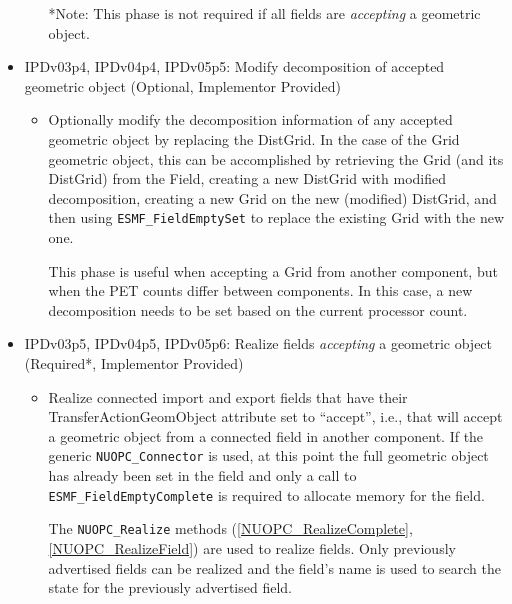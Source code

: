 \begin{itemize}
\begin{itemize}
*Note: This phase is not required if all fields are {\em accepting} a geometric object.
  \end{itemize}
\item IPDv03p4, IPDv04p4, IPDv05p5: Modify decomposition of accepted geometric object ({\sc Optional, Implementor Provided})
  \begin{itemize}
  \item Optionally modify the decomposition information of any accepted geometric object by replacing the DistGrid. In the case of the Grid geometric object, this can be accomplished by retrieving the Grid (and its DistGrid) from the Field, creating a new DistGrid with modified decomposition, creating a new Grid on the new (modified) DistGrid, and then using {\tt ESMF\_FieldEmptySet} to replace the existing Grid with the new one.

This phase is useful when accepting a Grid from another component, but when the PET counts differ between components. In this case, a new decomposition needs to be set based on the current processor count.
  \end{itemize}
\item IPDv03p5, IPDv04p5, IPDv05p6: Realize fields {\em accepting} a geometric object ({\sc Required*, Implementor Provided})
  \begin{itemize}
  \item Realize connected import and export fields that have their TransferActionGeomObject attribute set to ``accept'', i.e., that will accept a geometric object from a connected field in another component.  If the generic {\tt NUOPC\_Connector} is used, at this point the full geometric object has already been set in the field and only a call to {\tt ESMF\_FieldEmptyComplete} is required to allocate memory for the field.

The {\tt NUOPC\_Realize} methods (\ref{NUOPC_RealizeComplete}, \ref{NUOPC_RealizeField}) are used to realize fields. Only previously advertised fields can be realized and the field's name is used to search the state for the previously advertised field.


\end{itemize}
\end{itemize}
